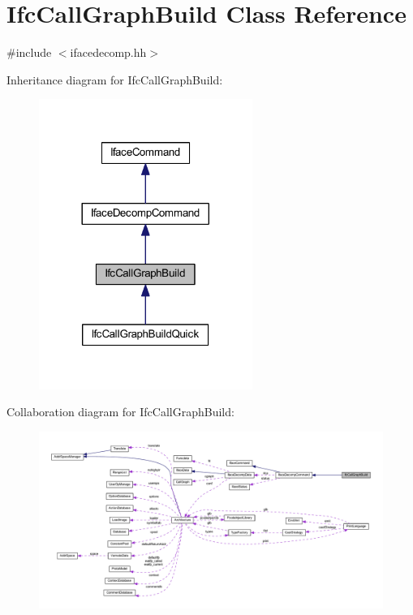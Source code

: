 \hypertarget{class_ifc_call_graph_build}{}\section{Ifc\+Call\+Graph\+Build Class Reference}
\label{class_ifc_call_graph_build}


{\ttfamily \#include $<$ifacedecomp.\+hh$>$}



Inheritance diagram for Ifc\+Call\+Graph\+Build\+:
\nopagebreak
\begin{figure}[H]
\begin{center}
\leavevmode
\includegraphics[width=197pt]{class_ifc_call_graph_build__inherit__graph}
\end{center}
\end{figure}


Collaboration diagram for Ifc\+Call\+Graph\+Build\+:
\nopagebreak
\begin{figure}[H]
\begin{center}
\leavevmode
\includegraphics[width=350pt]{class_ifc_call_graph_build__coll__graph}
\end{center}
\end{figure}
